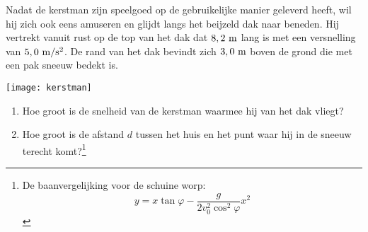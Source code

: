 \documentclass{ximera}
\begin{document}
\begin{exercise} Nadat de kerstman zijn speelgoed op de
gebruikelijke manier geleverd heeft, wil hij zich ook eens amuseren
en glijdt langs het beijzeld dak naar beneden. Hij vertrekt vanuit
rust op de top van het dak dat $8,2~\rm m$ lang is met een
versnelling van $5,0~\rm m/s^2$. De rand van het dak bevindt zich
$3,0~\rm m$ boven de grond die met een pak sneeuw bedekt is.
\begin{center}
\texttt{[image: kerstman]}
\end{center}
\begin{enumerate}
\item Hoe groot is de snelheid van de kerstman waarmee hij van het
dak vliegt?
\item Hoe groot is de afstand $d$ tussen het huis en het punt waar
hij in de sneeuw terecht komt?\footnote{De baanvergelijking voor de
schuine worp:
\[
y=x\tan\varphi-\frac{g}{2v_0^2\cos^2\varphi}x^2
\]}
\end{enumerate}

\end{exercise}
\end{document}

